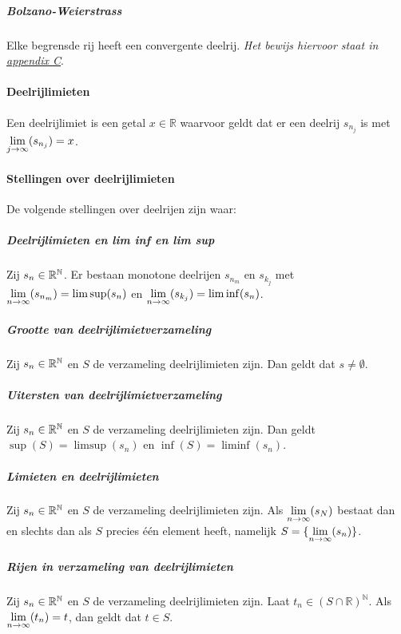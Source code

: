 \subparagraph{Bolzano-Weierstrass} Elke begrensde rij heeft een convergente deelrij. \textit{Het bewijs hiervoor staat in \hyperref[sec:AC]{appendix C}}.

\paragraph{Deelrijlimieten} Een deelrijlimiet is een getal $x\in\mathbb{R}$ waarvoor geldt dat er een deelrij $s_{n_{j}}$ is met $\underset{j\to\infty}{\text{lim}}(s_{n_{j}})=x$.

\paragraph{Stellingen over deelrijlimieten} De volgende stellingen over deelrijen zijn waar:

\subparagraph{Deelrijlimieten en lim inf en lim sup} Zij $s_{n}\in\mathbb{R}^{\mathbb{N}}$. Er bestaan monotone deelrijen $s_{n_{m}}$ en $s_{k_{j}}$ met $\underset{n\to\infty}{\text{lim}}(s_{n_{m}})=\limsup(s_{n})$ en $\underset{n\to\infty}{\text{lim}}(s_{k_{j}})=\liminf(s_{n})$.

\subparagraph{Grootte van deelrijlimietverzameling} Zij $s_{n}\in\mathbb{R}^{\mathbb{N}}$ en $S$ de verzameling deelrijlimieten zijn. Dan geldt dat $s\neq\emptyset$.

\subparagraph{Uitersten van deelrijlimietverzameling} Zij $s_{n}\in\mathbb{R}^{\mathbb{N}}$ en $S$ de verzameling deelrijlimieten zijn. Dan geldt $\sup(S)=\limsup(s_{n})$ en $\inf(S)=\liminf(s_{n})$.

\subparagraph{Limieten en deelrijlimieten} Zij $s_{n}\in\mathbb{R}^{\mathbb{N}}$ en $S$ de verzameling deelrijlimieten zijn. Als $\underset{n\to\infty}{\text{lim}}(s_{N})$ bestaat dan en slechts dan als $S$ precies één element heeft, namelijk $S=\{\underset{n\to\infty}{\text{lim}}(s_{n})\}$.

\subparagraph{Rijen in verzameling van deelrijlimieten} Zij $s_{n}\in\mathbb{R}^{\mathbb{N}}$ en $S$ de verzameling deelrijlimieten zijn. Laat $t_{n}\in(S\cap\mathbb{R})^{\mathbb{N}}$. Als $\underset{n\to\infty}{\text{lim}}(t_{n})=t$, dan geldt dat $t \in S$.